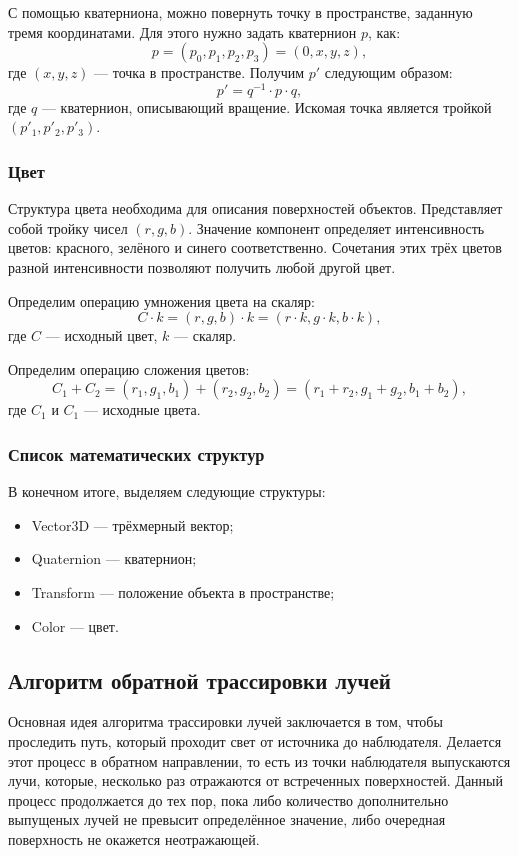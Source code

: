 С помощью кватерниона, можно повернуть точку в пространстве, заданную тремя координатами. Для этого нужно задать кватернион $p$, как:
\begin{equation}
	p=(p_0,p_1,p_2,p_3)=(0, x, y, z),
\end{equation}
где $(x, y, z)$ --- точка в пространстве. Получим $p'$ следующим образом:
\begin{equation}
	p'=q^{-1}\cdot p\cdot q,
\end{equation}
где $q$ --- кватернион, описывающий вращение. Искомая точка является тройкой $(p'_1, p'_2, p'_3)$.

\subsubsection{Цвет}
Структура цвета необходима для описания поверхностей объектов. Представляет собой тройку чисел $(r, g, b)$. Значение компонент определяет интенсивность цветов: красного, зелёного и синего соответственно. Сочетания этих трёх цветов разной интенсивности позволяют получить любой другой цвет.

Определим операцию умножения цвета на скаляр:
\begin{equation}
	C\cdot k=(r, g, b)\cdot k=(r\cdot k, g\cdot k, b\cdot k),
\end{equation}
где $C$ --- исходный цвет, $k$ --- скаляр.

Определим операцию сложения цветов:
\begin{equation}
	C_1+C_2=(r_1, g_1, b_1)+(r_2, g_2, b_2)=(r_1+r_2,g_1+g_2,b_1+b_2),
\end{equation}
где $C_1$ и $C_1$ --- исходные цвета.

\subsubsection{Список математических структур}
В конечном итоге, выделяем следующие структуры:
\begin{itemize}
	\item Vector3D --- трёхмерный вектор;
	\item Quaternion --- кватернион;
	\item Transform --- положение объекта в пространстве;
	\item Color --- цвет.
\end{itemize}

\subsection{Алгоритм обратной трассировки лучей}
Основная идея алгоритма трассировки лучей заключается в том, чтобы проследить путь, который проходит свет от источника до наблюдателя. Делается этот процесс в обратном направлении, то есть из точки наблюдателя выпускаются лучи, которые, несколько раз отражаются от встреченных поверхностей. Данный процесс продолжается до тех пор, пока либо количество дополнительно выпущеных лучей не превысит определённое значение, либо очередная поверхность не окажется неотражающей.

